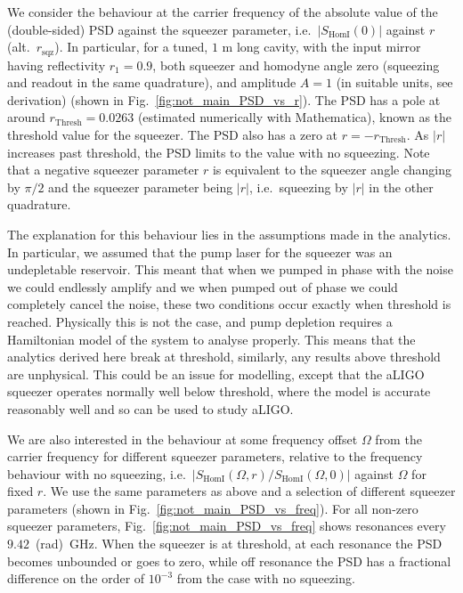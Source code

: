 \documentclass[aps,pra,superscriptaddress,reprint,nofootinbib]{revtex4-1}
\newcommand{\abs}[1]{\left\lvert #1 \right\rvert}
\begin{document}
We consider the behaviour at the carrier frequency of the absolute value of the (double-sided) PSD against the squeezer parameter, i.e.\ $\abs{S_{\mathrm{HomI}}(0)}$ against $r$ (alt.\ $r_\mathrm{sqz}$). In particular, for a tuned, $1$ m long cavity, with the input mirror having reflectivity $r_1 = 0.9$, both squeezer and homodyne angle zero (squeezing and readout in the same quadrature), and amplitude $A = 1$ (in suitable units, see derivation) (shown in Fig.~\ref{fig:not_main_PSD_vs_r}). The PSD has a pole at around $r_\mathrm{Thresh} = 0.0263$ (estimated numerically with Mathematica), known as the threshold value for the squeezer. The PSD also has a zero at $r = -r_\mathrm{Thresh}$. As $\abs{r}$ increases past threshold, the PSD limits to the value with no squeezing. Note that a negative squeezer parameter $r$ is equivalent to the squeezer angle changing by $\pi/2$ and the squeezer parameter being $\abs{r}$, i.e.\ squeezing by $\abs{r}$ in the other quadrature.


The explanation for this behaviour lies in the assumptions made in the analytics. In particular, we assumed that the pump laser for the squeezer was an undepletable reservoir. This meant that when we pumped in phase with the noise we could endlessly amplify and we when pumped out of phase we could completely cancel the noise, these two conditions occur exactly when threshold is reached. Physically this is not the case, and pump depletion requires a Hamiltonian model of the system to analyse properly. This means that the analytics derived here break at threshold, similarly, any results above threshold are unphysical.
This could be an issue for modelling, except that the aLIGO squeezer operates normally well below threshold, where the model is accurate reasonably well and so can be used to study aLIGO.


We are also interested in the behaviour at some frequency offset $\Omega$ from the carrier frequency for different squeezer parameters, relative to the frequency behaviour with no squeezing, i.e.\ $\abs{S_{\mathrm{HomI}}(\Omega, r)/S_{\mathrm{HomI}}(\Omega, 0)}$ against $\Omega$ for fixed $r$. We use the same parameters as above and a selection of different squeezer parameters (shown in Fig.~\ref{fig:not_main_PSD_vs_freq}). For all non-zero squeezer parameters, Fig.~\ref{fig:not_main_PSD_vs_freq} shows resonances every $9.42$~(rad)~GHz. When the squeezer is at threshold, at each resonance the PSD becomes unbounded or goes to zero, while off resonance the PSD has a fractional difference on the order of $10^{-3}$ from the case with no squeezing.
\end{document}
